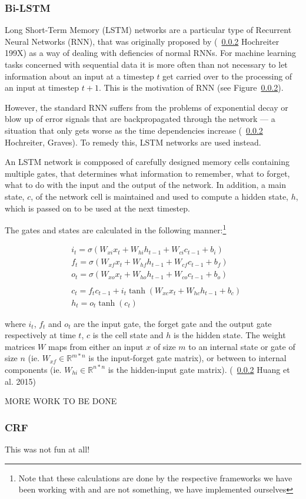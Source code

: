 \subsubsection{Bi-LSTM}

Long Short-Term Memory (LSTM) networks are a particular type of Recurrent Neural
Networks (RNN), that was originally proposed by (~\ref{} Hochreiter 199X) as a way of
dealing with defiencies of normal RNNs. For machine learning tasks concerned
with sequential data it is more often than not necessary to let information
about an input at a timestep $t$ get carried over to the processing of an input
at timestep $t+1$. This is the motivation of RNN (see Figure~\ref{}).

However, the standard RNN suffers from the problems of exponential decay or blow
up of error signals that are backpropagated through the network --- a situation
that only gets worse as the time dependencies increase (~\ref{} Hochreiter,
Graves). To remedy this, LSTM networks are used instead.

An LSTM network is compposed of carefully designed memory cells containing
multiple gates, that determines what information to remember, what to forget,
what to do with the input and the output of the network. In addition, a main
state, $c$, of the network cell is maintained and used to compute a hidden
state, $h$, which is passed on to be used at the next timestep.

The gates and states are calculated in the following manner:\footnote{Note that
    these calculations are done by the respective frameworks we have been
working with and are not something, we have implemented ourselves}

\begin{align*}
    & i_{t} = \sigma(W_{xi}x_{t} + W_{hi}h_{t-1} + W_{ci}c_{t-1} + b_{i})    \\
    & f_{t} = \sigma(W_{xf}x_{t} + W_{hf}h_{t-1} + W_{cf}c_{t-1} + b_{f})    \\
    & o_{t} = \sigma(W_{xo}x_{t} + W_{ho}h_{t-1} + W_{co}c_{t-1} + b_{o})    \\ \\
    & c_{t} = f_{t}c_{t-1} + i_{t}\tanh(W_{xc}x_{t} + W_{hc}h_{t-1} + b_{c}) \\
    & h_{t} = o_{t}\tanh(c_{t})
\end{align*}

where $i_{t}$, $f_{t}$ and $o_{t}$ are the input gate, the forget gate and the
output gate respectively at time $t$, $c$ is the cell state and $h$ is the
hidden state. The weight matrices $W$ maps from either an input $x$ of size $m$
to an internal state or gate of size $n$ (ie. $W_{xf} \in \mathbb{R}^{m*n}$ is the
input-forget gate matrix), or between to internal components (ie. $W_{hi} \in
\mathbb{R}^{n*n}$ is the hidden-input gate matrix). (~\ref{} Huang et al. 2015)


MORE WORK TO BE DONE





\subsubsection{CRF}

This was not fun at all!


